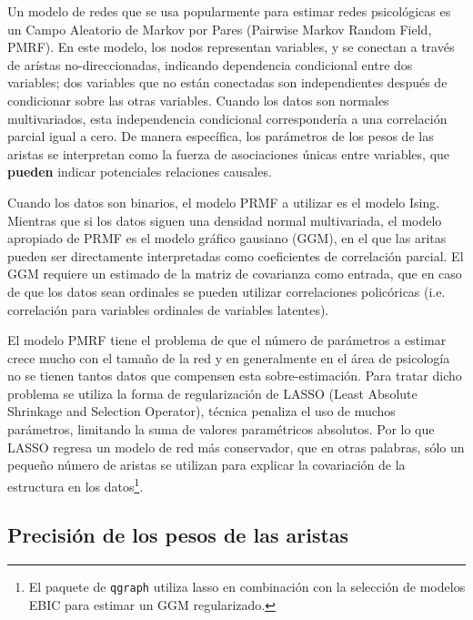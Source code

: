 \documentclass[11pt,spanish]{article}\usepackage[]{graphicx}\usepackage[]{color}
\begin{document}
Un modelo de redes que se usa popularmente para estimar redes psicológicas es un Campo Aleatorio de Markov por Pares (Pairwise Markov Random Field, PMRF). En este modelo, los nodos representan variables, y se conectan a través de arístas no-direccionadas, indicando dependencia condicional entre dos variables; dos variables que no están conectadas son independientes después de condicionar sobre las otras variables. Cuando los datos son normales multivariados, esta independencia condicional correspondería a una correlación parcial igual a cero. De manera específica, los parámetros de los pesos de las aristas se interpretan como la fuerza de asociaciones únicas entre variables, que {\bf pueden} indicar potenciales relaciones causales. 

Cuando los datos son binarios, el modelo PRMF a utilizar es el modelo Ising. Mientras que si los datos siguen una densidad normal multivariada, el modelo apropiado de PRMF es el modelo gráfico gausiano (GGM), en el que las aritas pueden ser directamente interpretadas como coeficientes de correlación parcial. El GGM requiere un estimado de la matriz de covarianza como entrada, que en caso de que los datos sean ordinales se pueden utilizar correlaciones policóricas (i.e. correlación para variables ordinales de variables latentes).

El modelo PMRF tiene el problema de que el número de parámetros a estimar crece mucho con el tamaño de la red y en generalmente en el área de psicología no se tienen tantos datos que compensen esta sobre-estimación. Para tratar dicho problema se utiliza la forma de regularización de LASSO (Least Absolute Shrinkage and Selection Operator), técnica penaliza el uso de muchos parámetros, limitando la suma de valores paramétricos absolutos. Por lo que LASSO regresa un modelo de red más conservador, que en otras palabras, sólo un pequeño número de aristas se utilizan para explicar la covariación de la estructura en los datos\footnote{El paquete de \texttt{qgraph} utiliza lasso en combinación con la selección de modelos EBIC para estimar un GGM regularizado.}. 


\subsection{Precisión de los pesos de las aristas}
\end{document}

